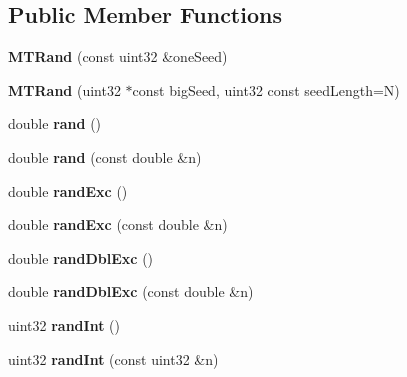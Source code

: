 \subsection*{Public Member Functions}
\begin{DoxyCompactItemize}
\item 
\hypertarget{classMTRand_ab4f392e44228a583b7b1a3f036fb2fd0}{}{\bfseries M\+T\+Rand} (const uint32 \&one\+Seed)\label{classMTRand_ab4f392e44228a583b7b1a3f036fb2fd0}

\item 
\hypertarget{classMTRand_a380e79e0192b46426abcefa6e2dd082e}{}{\bfseries M\+T\+Rand} (uint32 $\ast$const big\+Seed, uint32 const seed\+Length=N)\label{classMTRand_a380e79e0192b46426abcefa6e2dd082e}

\item 
\hypertarget{classMTRand_a76d129a2d850c24ff4a0613f299cf3a5}{}double {\bfseries rand} ()\label{classMTRand_a76d129a2d850c24ff4a0613f299cf3a5}

\item 
\hypertarget{classMTRand_a7a47382fb7b19ae1f330691735dc800b}{}double {\bfseries rand} (const double \&n)\label{classMTRand_a7a47382fb7b19ae1f330691735dc800b}

\item 
\hypertarget{classMTRand_afd05e468983b3a3d66ce0f403bd666af}{}double {\bfseries rand\+Exc} ()\label{classMTRand_afd05e468983b3a3d66ce0f403bd666af}

\item 
\hypertarget{classMTRand_a2955abdb96e6cab97e50ac755d48dad1}{}double {\bfseries rand\+Exc} (const double \&n)\label{classMTRand_a2955abdb96e6cab97e50ac755d48dad1}

\item 
\hypertarget{classMTRand_a4d3a475aa72fe6d1a6d7d9e16d6a732e}{}double {\bfseries rand\+Dbl\+Exc} ()\label{classMTRand_a4d3a475aa72fe6d1a6d7d9e16d6a732e}

\item 
\hypertarget{classMTRand_a587c90f52c35fa2bf05d34791dd5457e}{}double {\bfseries rand\+Dbl\+Exc} (const double \&n)\label{classMTRand_a587c90f52c35fa2bf05d34791dd5457e}

\item 
\hypertarget{classMTRand_ad1008efd4fe0e8aae30459c2c58cfe35}{}uint32 {\bfseries rand\+Int} ()\label{classMTRand_ad1008efd4fe0e8aae30459c2c58cfe35}

\item 
\hypertarget{classMTRand_a18ea21f615df06c9359c34d2eba6f252}{}uint32 {\bfseries rand\+Int} (const uint32 \&n)\label{classMTRand_a18ea21f615df06c9359c34d2eba6f252}


\end{DoxyCompactItemize}
